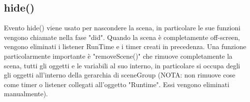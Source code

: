 \documentclass[12pt]{article}
\begin{document}
\subsection{hide()}
Evento hide() viene usato per nascondere la scena, in particolare le sue funzioni vengono chiamate nella fase "did". Quando la scena è 
completamente off-screen, vengono eliminati i listener RunTime e i timer creati in precedenza. Una funzione particolarmente importante
 è "removeScene()" che rimuove completamente la scena, tutti gli oggetti e le variabili al suo interno, in particolare si occupa degli 
 gli oggetti all'interno della gerarchia di sceneGroup (NOTA: non rimuove cose come timer o listener collegati all'oggetto "Runtime". Essi vengono eliminati manualmente).
\end{document}

